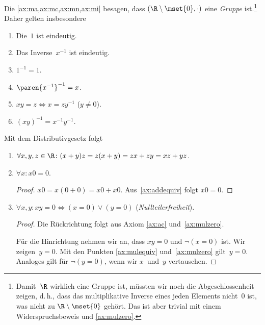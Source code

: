\documentclass[a4paper]{article}
\begin{document}
Die \cref{ax:ma,ax:mc,ax:mn,ax:mi} besagen, dass $(\R \setminus \mset{0}, \cdot)$ eine \emph{Gruppe} ist.\footnote{Damit~$\R$ wirklich eine Gruppe ist, müssten wir noch die Abgeschlossenheit zeigen, d.\,h., dass das multiplikative Inverse eines jeden Elements nicht~$0$ ist, was nicht zu $\R \setminus \mset{0}$ gehört. Das ist aber trivial mit einem Widerspruchsbeweis und \cref{ax:mulzero}.} Daher gelten insbesondere
\begin{enumerate}[(a'), leftmargin=*, widest=(m)]
    \item Die~$1$ ist eindeutig.
    \item Das Inverse~$x^{-1}$ ist eindeutig.
    \item $1^{-1} = 1$.
    \item $\paren{x^{-1}}^{-1} = x$.
    \item $x y = z \iff x = z y^{-1}$ ($y \neq 0$).\label{ax:mulequiv}
    \item $(x y)^{-1} = x^{-1} y^{-1}$.
\end{enumerate}

Mit dem Distributivgesetz folgt
\begin{enumerate}[resume*=conclusions]
    \item $\forall x,y,z \in \R\colon (x+y)z = z(x+y) = zx + zy = xz + yz$.
    \item $\forall x\colon x0 = 0$.
          \begin{proof}
              $x0 = x(0+0) = x0 + x0$. Aus~\cref{ax:addequiv} folgt $x0 = 0$.\label{ax:mulzero}
          \end{proof}
    \item $\forall x,y\colon xy = 0 \iff (x=0) \vee (y=0)$ (\emph{Nullteilerfreiheit}).
          \begin{proof}
              Die Rückrichtung folgt aus Axiom \ref{ax:ac} und~\cref{ax:mulzero}.

              Für die Hinrichtung nehmen wir an, dass $xy = 0$ und $\neg (x = 0)$ ist. Wir zeigen~$y = 0$. Mit den Punkten \ref{ax:mulequiv} und~\ref{ax:mulzero} gilt~$y = 0$. Analoges gilt für $\neg (y = 0)$, wenn wir $x$~und~$y$ vertauschen.
          \end{proof}
\end{enumerate}
\end{document}
